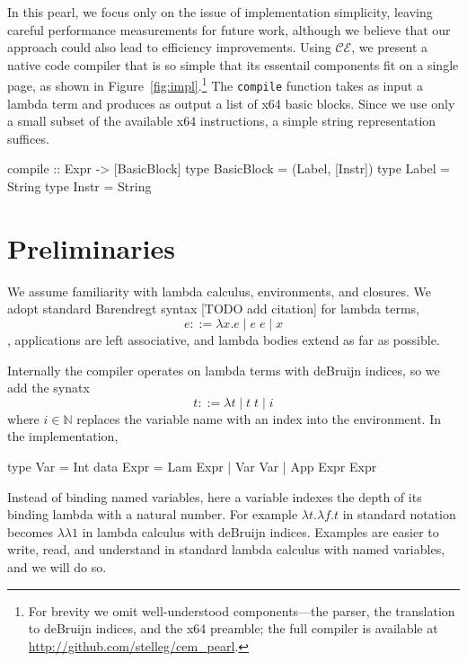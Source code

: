 \documentclass[preprint]{sigplanconf}
\begin{document}
In this pearl, we focus only on the issue of implementation
simplicity, leaving careful
performance measurements for future work, although we believe that 
our approach could also lead to efficiency improvements.
Using $\mathcal{CE}$, we present a native code compiler that is so
simple that its essentail components fit on a single page, as shown in
Figure~\ref{fig:impl}.\footnote{For brevity we omit well-understood components---the
  parser, the translation to deBruijn indices, and the x64 preamble;
  the full compiler is available at \url{http://github.com/stelleg/cem_pearl}.}
The \texttt{compile} function takes as input a lambda term and
produces as output a list
of x64 basic blocks. Since we use only a small subset of the available x64
instructions, a simple string representation suffices.
\begin{code}
compile :: Expr -> [BasicBlock]
type BasicBlock = (Label, [Instr])
type Label = String
type Instr = String
\end{code}


\section{Preliminaries}

We assume familiarity with lambda calculus, environments, and closures.
We adopt standard Barendregt syntax [TODO add citation] for lambda terms,
$$ e ::=  \lambda x . e \; | \; e \;  e \; | \;
x $$, applications are left
associative, and lambda bodies extend as far as possible. 

Internally the compiler operates on lambda terms with deBruijn indices,
so we add the synatx $$ t ::= \lambda t \; | \; t \;
t \; | \; i $$ where $i \in \mathbb{N}$ replaces the variable name with an index
into the environment.   In the implementation,
\begin{code}
type Var = Int
data Expr = Lam Expr
           | Var Var
           | App Expr Expr
\end{code}
Instead of
binding named variables, here a variable indexes the depth of its binding lambda with
a natural number. For example $\lambda t.\lambda f.t$ in standard notation
becomes $\lambda\lambda1$ in lambda calculus with deBruijn indices. 
Examples are easier to write, read, and understand in standard lambda
calculus with named variables, and we will do so.
\end{document}
